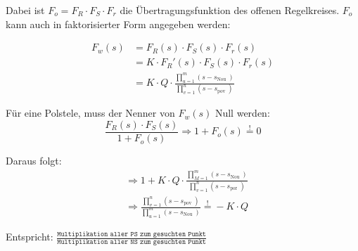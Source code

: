 \documentclass[10pt,a4paper]{article}
\begin{document}
\begin{mdframed}[style=exercise]
	Dabei ist $F_o = F_R \cdot F_S \cdot F_r$ die Übertragungsfunktion des
	offenen Regelkreises. $F_o$ kann auch in faktorisierter Form angegeben
	werden:
\end{mdframed}

\begin{align*}
	F_w (s) & = F_R (s) \cdot F_S (s) \cdot F_r (s)
	\\ & =K \cdot F_R '(s) \cdot F_S (s) \cdot F_r (s)
	\\ & =K \cdot Q \cdot \frac{\prod_{u=1}^{m}\left(s-s_{\text {Nou
			}}\right)}{\prod_{v=1}^{n}\left(s-s_{\text {pov }}\right)}
\end{align*}

Für eine Polstele, muss der Nenner von $F_w (s)$ Null werden:
\[
	\dfrac{F_R (s) \cdot F_S (s)}{1+F_o (s)} \Rightarrow 1+F_o (s) \stackrel{!}{=}0
\]

Daraus folgt:
\begin{align*}
	 & \Rightarrow 1+ K \cdot Q \cdot \frac{\prod_{M=1}^{m}\left(s-s_{\text {Nou }}\right)}{\prod_{v=1}^{n}\left(s-s_{\text {por }}\right)}         \\
	 & \Rightarrow \frac{\prod_{v=1}^{n}\left(s-s_{\text {pov }}\right)}{\prod_{u=1}^{m}\left(s-s_{\text {Nou }}\right)} \stackrel{!}{=} -K \cdot Q
\end{align*}

Entspricht: $\frac{\texttt{Multiplikation aller PS zum gesuchten Punkt}}
	{\texttt{Multiplikation aller NS zum gesuchten Punkt}}$
\end{document}
